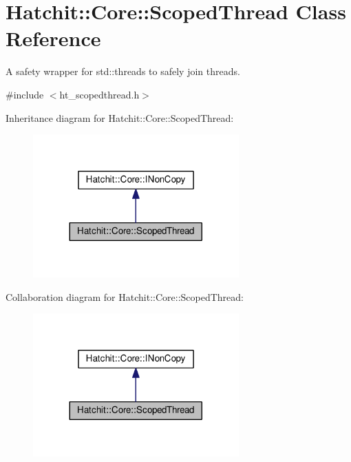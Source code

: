 \hypertarget{classHatchit_1_1Core_1_1ScopedThread}{}\section{Hatchit\+:\+:Core\+:\+:Scoped\+Thread Class Reference}
\label{classHatchit_1_1Core_1_1ScopedThread}


A safety wrapper for std\+::threads to safely join threads.  




{\ttfamily \#include $<$ht\+\_\+scopedthread.\+h$>$}



Inheritance diagram for Hatchit\+:\+:Core\+:\+:Scoped\+Thread\+:
\nopagebreak
\begin{figure}[H]
\begin{center}
\leavevmode
\includegraphics[width=224pt]{classHatchit_1_1Core_1_1ScopedThread__inherit__graph}
\end{center}
\end{figure}


Collaboration diagram for Hatchit\+:\+:Core\+:\+:Scoped\+Thread\+:
\nopagebreak
\begin{figure}[H]
\begin{center}
\leavevmode
\includegraphics[width=224pt]{classHatchit_1_1Core_1_1ScopedThread__coll__graph}
\end{center}
\end{figure}
